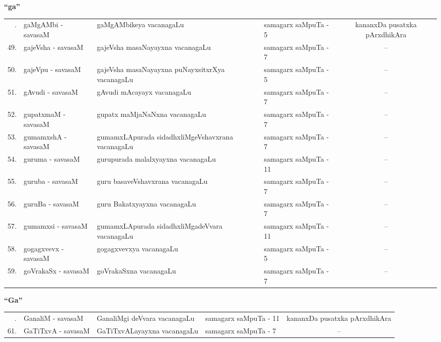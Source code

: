\centerline{\bf ``ga''}

{\renewcommand{\arraystretch}{1.3}
\begin{longtable}{rl>{\raggedright}p{5.5cm}lc}
\hline
\endfirsthead
\hline
\endhead
\hline
\endfoot
\endlastfoot
48. &  gaMgAMbi - savasaM & gaMgAMbikeya vacanagaLu & samagarx saMpuTa - 5  & kananxDa pusatxka pArxdhikAra\\
49. &  gajeVsha - savasaM & gajeVsha masaNayayxna vacanagaLu & samagarx saMpuTa - 7 & --\\
50. &  gajeVpu - savasaM & gajeVsha masaNayayxna puNayxsitxrXya vacanagaLu & samagarx saMpuTa - 5 & --\\
51. &  gAvudi - savasaM &  gAvudi mAcayayx vacanagaLu & samagarx saMpuTa - 7 & --\\
52. &  gupatxmaM - savasaM & gupatx maMjaNaNxna vacanagaLu & samagarx saMpuTa - 7 & --\\
53. &  gumamxshA - savasaM & gumamxLApurada sidadhxliMgeVshavxrana vacanagaLu & samagarx saMpuTa - 7 & --\\
54. &  guruma - savasaM & gurupurada malalxyayxna vacanagaLu & samagarx saMpuTa - 11 & --\\
55. &  guruba - savasaM & guru basaveVshavxrana vacanagaLu & samagarx saMpuTa - 7 & --\\
56. &  guruBa - savasaM & guru Bakatxyayxna vacanagaLu & samagarx saMpuTa - 7 & --\\
57. &  gumamxsi - savasaM & gumamxLApurada sidadhxliMgadeVvara vacanagaLu & samagarx saMpuTa - 11 & --\\
58. & gogagxvevx  - savasaM & gogagxvevxya vacanagaLu & samagarx saMpuTa - 5 & --\\
59. &  goVrakaSx - savasaM & goVrakaSxna vacanagaLu & samagarx saMpuTa - 7 & --\\
\hline
\end{longtable}}

\centerline{\bf ``Ga''}

{\renewcommand{\arraystretch}{1.3}
\begin{longtable}{rl>{\raggedright}p{5.5cm}lc}
\hline
\endfirsthead
\hline
\endhead
\hline
\endfoot
\endlastfoot
60. &  GanaliM - savasaM & GanaliMgi deVvara vacanagaLu & samagarx saMpuTa - 11  & kananxDa pusatxka pArxdhikAra\\
61. &  GaTiTxvA - savasaM & GaTiTxvALayayxna vacanagaLu & samagarx saMpuTa - 7 & --\\
\hline
\end{longtable}}

